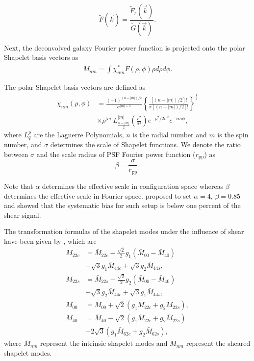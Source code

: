 \documentclass[a4paper,fleqn,usenatbib]{mnras}
\begin{document}
\begin{equation}\label{PSF deconvolution_fourier}
\tilde{F}(\vec{k})=\frac{\tilde{F}_r(\vec{k})}{\tilde{G}(\vec{k})}.
\end{equation}

Next, the deconvolved galaxy Fourier power function is projected onto the polar
Shapelet basis vectors \citep{polar_Shapelets} as
\begin{align}\label{Shapelets_decompose}
M_{nm}=\int \chi_{nm}^{*} \tilde{F}(\rho,\phi) \rho d\rho d\phi.
\end{align}

The polar Shapelet basis vectors are defined as
\begin{align*}
\chi_{nm}(\rho,\phi)&=\frac{(-1)^{(n-|m|)/2}}{\sigma^{|m|+1}}\left\lbrace
    \frac{[(n-|m|)/2]!}{\pi[(n+|m|)/2]!}\right\rbrace^\frac{1}{2}\\
    &\times
    \rho^{|m|}L^{|m|}_{\frac{n-|m|}{2}}\left(\frac{r^2}{\sigma^2}\right)e^{-\rho^2/2\sigma^2}
    e^{-im\phi},
\end{align*}
where $L^{p}_{q}$ are the Laguerre Polynomials, $n$ is the radial number and
$m$ is the spin number, and $\sigma$ determines the scale of Shapelet
functions. We denote the ratio between $\sigma$ and the scale radius of PSF
Fourier power function ($r_{\text{pp}}$) as \citep{Li18FPFS}
\begin{equation}
\beta=\frac{\sigma}{r_{\text{pp}}}.
\end{equation}

Note that $\alpha$ determines the effective scale in configuration space
whereas $\beta$ determines the effective scale in Fourier space.
\citet{Li18FPFS} proposed to set $\alpha=4$, $\beta=0.85$ and showed that the
systematic bias for such setup is below one percent of the shear signal.


The transformation formulas of the shapelet modes under the influence of shear
have been given by \citet{polar_Shapelets}, which are
\begin{equation}\label{Shapelets_Moments_shear_Transform}
\begin{split}
M_{22c}&=\bar{M}_{22c}-\frac{\sqrt{2}}{2}g_1(\bar{M}_{00}-\bar{M}_{40})\\
&+\sqrt{3}g_1 \bar{M}_{44c}+\sqrt{3} g_2 \bar{M}_{44s},\\
M_{22s}&=\bar{M}_{22s}-\frac{\sqrt{2}}{2}g_2(\bar{M}_{00}-\bar{M}_{40})\\
&-\sqrt{3}g_2 \bar{M}_{44c}+\sqrt{3} g_1 \bar{M}_{44s},\\
M_{00} &=\bar{M}_{00}+\sqrt{2}(g_1\bar{M}_{22c}+g_2\bar{M}_{22s}),\\
M_{40} &=\bar{M}_{40}-\sqrt{2}(g_1\bar{M}_{22c}+g_2\bar{M}_{22s})\\
&+2\sqrt{3}(g_1\bar{M}_{62c}+g_2\bar{M}_{62s}),
\end{split}
\end{equation}
where $\bar{M}_{nm}$ represent the intrinsic shapelet modes and $M_{nm}$
represent the sheared shapelet modes.
\end{document}
